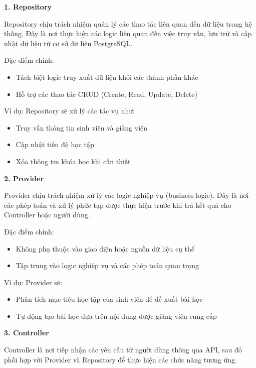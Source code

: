 \textbf{1. Repository} 

Repository chịu trách nhiệm quản lý các thao tác liên quan đến dữ liệu trong hệ thống. Đây là nơi thực hiện các logic liên quan đến việc truy vấn, lưu trữ và cập nhật dữ liệu từ cơ sở dữ liệu PostgreSQL.

Đặc điểm chính:

\begin{itemize}
    \item Tách biệt logic truy xuất dữ liệu khỏi các thành phần khác
    \item Hỗ trợ các thao tác CRUD (Create, Read, Update, Delete)
\end{itemize}

Ví dụ: Repository sẽ xử lý các tác vụ như:

\begin{itemize}
    \item Truy vấn thông tin sinh viên và giảng viên
    \item Cập nhật tiến độ học tập
    \item Xóa thông tin khóa học khi cần thiết
\end{itemize}

\textbf{2. Provider} 

Provider chịu trách nhiệm xử lý các logic nghiệp vụ (business logic). Đây là nơi các phép toán và xử lý phức tạp được thực hiện trước khi trả kết quả cho Controller hoặc người dùng.

Đặc điểm chính:

\begin{itemize}
    \item Không phụ thuộc vào giao diện hoặc nguồn dữ liệu cụ thể
    \item Tập trung vào logic nghiệp vụ và các phép toán quan trọng
\end{itemize}

Ví dụ: Provider sẽ:

\begin{itemize}
    \item Phân tích mục tiêu học tập của sinh viên để đề xuất bài học
    \item Tự động tạo bài học dựa trên nội dung được giảng viên cung cấp
\end{itemize}
 
\textbf{3. Controller} 

Controller là nơi tiếp nhận các yêu cầu từ người dùng thông qua API, sau đó phối hợp với Provider và Repository để thực hiện các chức năng tương ứng.

